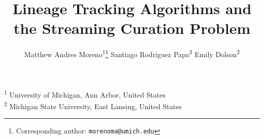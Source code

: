 \title{ Lineage Tracking Algorithms and the Streaming Curation Problem }
\author{
    Matthew Andres Moreno\textsuperscript{1}\thanks{Corresponding author: \texttt{morenoma@umich.edu}} \quad
    Santiago Rodriguez Papa\textsuperscript{2} \quad
    Emily Dolson\textsuperscript{2}
}
\date{}

\newcommand{\affil}[1]{\textsuperscript{#1}}
\newcommand{\affiliations}{
    \affil{1} University of Michigan, Ann Arbor, United States \\
    \affil{2} Michigan State University, East Lansing, United States
}

\maketitle

\begin{center}
\affiliations
\end{center}


